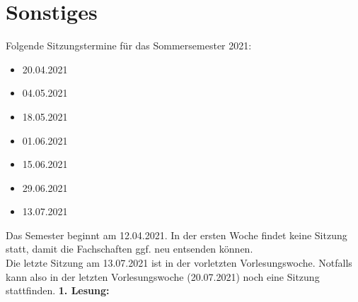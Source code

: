 \section{Sonstiges}
{
	Folgende Sitzungstermine für das Sommersemester 2021:
	\begin{itemize}
		\item 20.04.2021
		\item 04.05.2021
		\item 18.05.2021
		\item 01.06.2021
		\item 15.06.2021
		\item 29.06.2021
		\item 13.07.2021
	\end{itemize}
}{
	Das Semester beginnt am 12.04.2021. In der ersten Woche findet keine Sitzung statt, damit die Fachschaften ggf. neu entsenden können.\\
	Die letzte Sitzung am 13.07.2021 ist in der vorletzten Vorlesungswoche. Notfalls kann also in der letzten Vorlesungswoche (20.07.2021) noch eine Sitzung stattfinden.
}{
	\textbf{1. Lesung:}
    \ul{}
}{
}